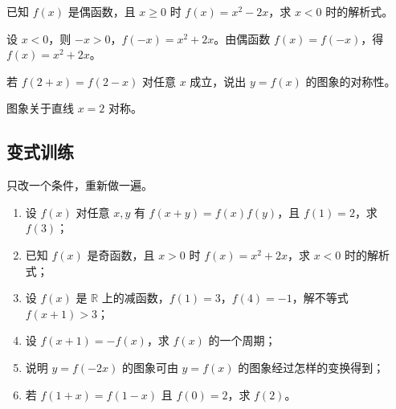 \begin{explore}
\begin{example}
已知 $f(x)$ 是偶函数，且 $x\geq0$ 时 $f(x)=x^2-2x$，求 $x<0$ 时的解析式。
\end{example}
\begin{solution}
设 $x<0$，则 $-x>0$，$f(-x)=x^2+2x$。由偶函数 $f(x)=f(-x)$，得 $f(x)=x^2+2x$。
\end{solution}

\begin{problem}
若 $f(2+x)=f(2-x)$ 对任意 $x$ 成立，说出 $y=f(x)$ 的图象的对称性。
\end{problem}
\begin{solution}
图象关于直线 $x=2$ 对称。
\end{solution}
\end{explore}

\begin{inclasstest}
\subsection{变式训练}
只改一个条件，重新做一遍。
\begin{enumerate}
  \item 设 $f(x)$ 对任意 $x,y$ 有 $f(x+y)=f(x)f(y)$，且 $f(1)=2$，求 $f(3)$；
  \item 已知 $f(x)$ 是奇函数，且 $x>0$ 时 $f(x)=x^2+2x$，求 $x<0$ 时的解析式；
  \item 设 $f(x)$ 是 $\mathbb{R}$ 上的减函数，$f(1)=3$，$f(4)=-1$，解不等式 $f(x+1)>3$；
  \item 设 $f(x+1)=-f(x)$，求 $f(x)$ 的一个周期；
  \item 说明 $y=f(-2x)$ 的图象可由 $y=f(x)$ 的图象经过怎样的变换得到；
  \item 若 $f(1+x)=f(1-x)$ 且 $f(0)=2$，求 $f(2)$。
\end{enumerate}
\end{inclasstest}

